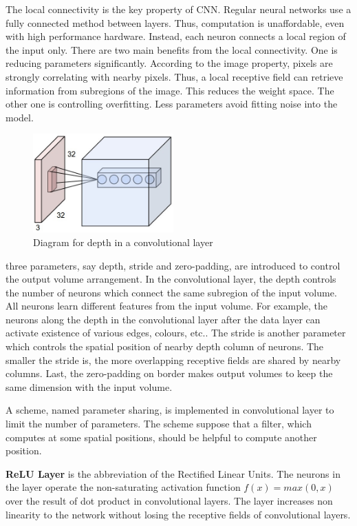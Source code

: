 The local connectivity is the key property of CNN. Regular neural networks use a fully connected method between layers. Thus, computation is unaffordable, even with high performance hardware. Instead, each neuron connects a local region of the input only. There are two main benefits from the local connectivity. One is reducing parameters significantly.  According to the image property, pixels are strongly correlating with nearby pixels. Thus, a local receptive field can retrieve information from subregions of the image. This reduces the weight space. The other one is controlling overfitting. Less parameters avoid fitting noise into the model.

\graphicspath{ {./Figures/} }
\begin{figure}
  \begin{center}
    \includegraphics[width=0.48\textwidth]{depthcol.jpeg}
  \end{center}
  \caption{Diagram for depth in a convolutional layer}
\end{figure}
three parameters, say depth, stride and zero-padding, are introduced to control the output volume arrangement. In the convolutional layer, the depth controls the number of neurons which connect the same subregion of the input volume. All neurons learn different features from the input volume. For example, the neurons along the depth in the convolutional layer after the data layer can activate existence of various edges, colours, etc.. The stride is another parameter which controls the spatial position of nearby depth column of neurons. The smaller the stride is, the more overlapping receptive fields are shared by nearby columns. Last, the zero-padding on border makes output volumes to keep the same dimension with the input volume.

A scheme, named parameter sharing, is implemented in convolutional layer to limit the number of parameters. The scheme suppose that a filter, which computes at some spatial positions, should be helpful to compute another position.

\textbf{ReLU Layer} is the abbreviation of the Rectified Linear Units. The neurons in the layer operate the non-saturating activation function $f(x) = max(0,x)$ over the result of dot product in convolutional layers. The layer increases non linearity to the network without losing the receptive fields of convolutional layers.


